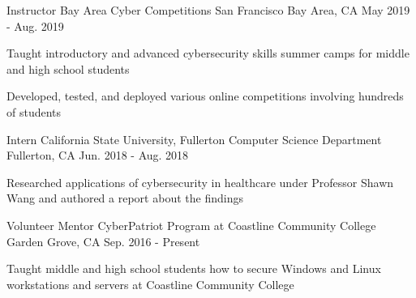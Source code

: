 

\begin{cventries}

  \cventry
    {Instructor} %
    {Bay Area Cyber Competitions} %
    {San Francisco Bay Area, CA} %
    {May 2019 - Aug. 2019} %
    {
      \begin{cvitems} %
        \item {Taught introductory and advanced cybersecurity skills summer camps for middle and high school students}
        \item {Developed, tested, and deployed various online competitions involving hundreds of students}
      \end{cvitems}
    }

  \cventry
    {Intern} %
    {California State University, Fullerton Computer Science Department} %
    {Fullerton, CA} %
    {Jun. 2018 - Aug. 2018} %
    {
      \begin{cvitems} %
        \item {Researched applications of cybersecurity in healthcare under Professor Shawn Wang and authored a report about the findings}
      \end{cvitems}
    }
    
  \cventry
    {Volunteer Mentor} %
    {CyberPatriot Program at Coastline Community College} %
    {Garden Grove, CA} %
    {Sep. 2016 - Present} %
    {
      \begin{cvitems} %
        \item {Taught middle and high school students how to secure Windows and Linux workstations and servers at Coastline Community College}
      \end{cvitems}
    }

\end{cventries}
